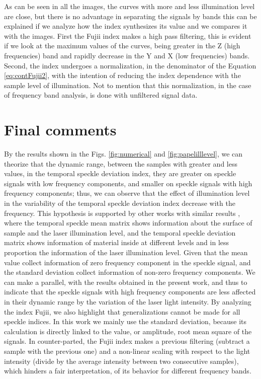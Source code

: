 \documentclass[review]{elsarticle}
\begin{document}
As can be seen in all the images, the curves with more and less  illumination level are close,
but there is no advantage in separating the signals by bands
this can be explained if we analyze how the index synthesizes its value and we compares it with the images.
First the Fujii index makes a high pass filtering,
this is evident if we look at the maximum values of the curves,
being greater in the Z (high frequencies) band and rapidly decrease in the Y and X (low frequencies) bands.
Second, the index undergoes a normalization, in the denominator of the Equation \ref{eq:contFujii2},
with the intention of reducing the index dependence with the sample level of illumination.
Not to mention that this normalization, in the case of frequency band analysis, is done with unfiltered signal data.

\section{Final comments} 

By the results shown in the Figs. \ref{fig:numerical} and \ref{fig:papelilllevel},
we can theorize that the dynamic range,
between the samples with greater and  less values, 
in  the temporal speckle deviation index,
they are greater on speckle signals with low frequency components, 
and  smaller on speckle signals with high frequency components;
thus, we can observe that the effect of illumination level in 
the variability of the temporal speckle deviation index decrease with the frequency.
This hypothesis is supported by other works with similar results \cite{Nothdurft:05},
where the temporal speckle mean matrix shows information about the surface of sample and the laser illumination level, 
and the temporal speckle deviation matrix shows information of material inside at 
different levels and in less proportion the information of the laser illumination level.
Given that the mean value collect information of zero frequency component in the speckle signal, 
and the standard deviation  collect information of non-zero frequency components.
We can make a parallel, 
with the results obtained in the present work,
and thus  to indicate that the speckle signals with high frequency components
 are less affected in their dynamic range by the variation of the laser light intensity.
By analyzing the index Fujii, 
we also highlight that generalizations cannot be made for all speckle indices.
In this work we mainly use the standard deviation, because its calculation is directly linked to the value, 
or amplitude, root mean square of the signals.
In counter-parted, the Fujii index makes a previous filtering (subtract a sample with the previous one) 
and a non-linear scaling with respect to the light intensity (divide by the average intensity between two consecutive samples), 
which hinders a fair interpretation, of its behavior for different frequency bands.
\end{document}
